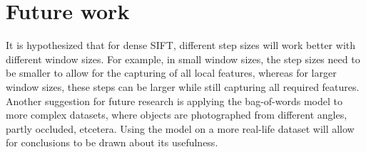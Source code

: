 \documentclass{article} %
\begin{document}
\section{Future work}
It is hypothesized that for dense SIFT, different step sizes will work better with different window sizes. For example, in small window sizes, the step sizes need to be smaller to allow for the capturing of all local features, whereas for larger window sizes, these steps can be larger while still capturing all required features. \\
Another suggestion for future research is applying the bag-of-words model to more complex datasets, where objects are photographed from different angles, partly occluded, etcetera. Using the model on a more real-life dataset will allow for conclusions to be drawn about its usefulness.


\end{document}
